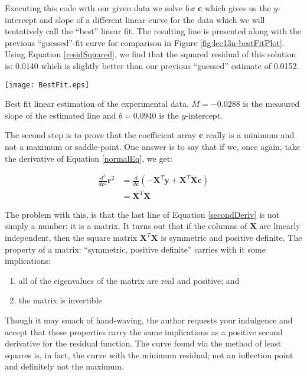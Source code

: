 Executing this code with our given data we solve for $\mathbf{c}$ which gives
us the $y$-intercept and slope of a different linear curve for the data which we will tentatively call the ``best'' linear fit. The resulting line is presented along with the previous ``guessed''-fit curve
for comparison in Figure \ref{fig:lec13n-bestFitPlot}.  Using Equation \ref{residSquared}, we find that the squared residual of this solution is: 0.0140 which is slightly better than our previous ``guessed''
estimate of 0.0152.

\begin{marginfigure}
\texttt{[image: BestFit.eps]}
\caption{Best fit linear estimation of the experimental data.  $M =
  -0.0288$ is the measured slope of the estimated line and $b = 0.0940$ is the $y$-intercept.}
\label{fig:lec13n-bestFitPlot}
\end{marginfigure}  



The second step is to prove that the coefficient array $\mathbf{c}$ really is a minimum and not a maximum or saddle-point.    One answer is to say that if we, once again, take the derivative of Equation \ref{normalEq}, we get:

\begin{equation}
\begin{split}
\frac{d^{2}}{d \mathbf{c}^{2}}\mathbf{r}^{2} &= \frac{d}{d \mathbf{c}} \left(-\mathbf{X}^{T}\mathbf{y} + \mathbf{X}^{T}\mathbf{X}\mathbf{c}\right) \\
&= \mathbf{X}^{T}\mathbf{X}
\end{split}
\label{secondDeriv}
\end{equation}

The problem with this, is that the last line of Equation \ref{secondDeriv} is not simply a number; it is a matrix. It turns out that if the columns of $\mathbf{X}$ are linearly independent, then the square matrix $\mathbf{X}^{T}\mathbf{X}$ is symmetric and positive definite.  The property of a matrix: ``symmetric, positive definite'' carries with it some implications:

\begin{enumerate}
\item all of the eigenvalues of the matrix are real and positive; and
\item the matrix is invertible
\end{enumerate}

Though it may smack of hand-waving, the author requests your indulgence and accept that these properties carry the same implications as a positive second derivative for the residual function.  The curve found via the method of least squares is, in fact, the curve with the minimum residual; not an inflection point and definitely not the maximum.


